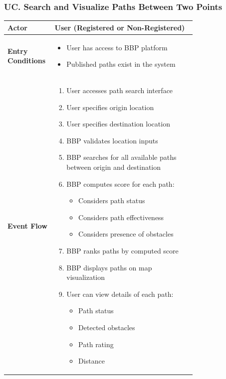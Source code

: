 \subsubsection*{UC\cuc . Search and Visualize Paths Between Two Points}
\begin{center}
    \begin{longtable}{|l|p{0.75\linewidth}|}
        \hline
        \textbf{Actor}            & User (Registered or Non-Registered) \\
        \hline
        \textbf{Entry Conditions} & 
        \begin{itemize}
            \item User has access to BBP platform
            \item Published paths exist in the system
        \end{itemize} \\
        \hline
        \textbf{Event Flow}       & 
        \begin{enumerate}
            \item User accesses path search interface
            \item User specifies origin location
            \item User specifies destination location
            \item BBP validates location inputs
            \item BBP searches for all available paths between origin and destination
            \item BBP computes score for each path:
            \begin{itemize}
                \item Considers path status
                \item Considers path effectiveness
                \item Considers presence of obstacles
            \end{itemize}
            \item BBP ranks paths by computed score
            \item BBP displays paths on map visualization
            \item User can view details of each path:
            \begin{itemize}
                \item Path status
                \item Detected obstacles
                \item Path rating
                \item Distance

\end{itemize}
\end{enumerate}
\end{longtable}
\end{center}
